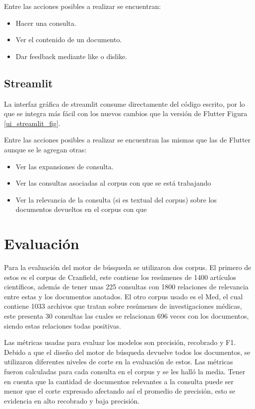 \documentclass[runningheads]{llncs}
\begin{document}
Entre las acciones posibles a realizar se encuentran:

\begin{itemize}

\item Hacer una consulta.
\item Ver el contenido de un documento.
\item Dar feedback mediante like o dislike.

\end{itemize}

\subsection{Streamlit}

La interfaz gráfica de streamlit consume directamente del código escrito, por lo que se 
integra más fácil con los nuevos cambios que la versión de Flutter Figura \ref{ui_streamlit_fig}.

Entre las acciones posibles a realizar se encuentran las mismas que las de Flutter aunque se le
agregan otras:

\begin{itemize}

\item Ver las expansiones de consulta.
\item Ver las consultas asociadas al corpus con que se está trabajando
\item Ver la relevancia de la consulta (si es textual del corpus) sobre los 
documentos devueltos en el corpus con que

\end{itemize}

\section{Evaluación}

Para la evaluación del motor de búsqueda se utilizaron dos corpus. El primero de estos
es el corpus de Cranfield, este contiene los resúmenes de 1400 artículos científicos, además
de tener unas 225 consultas con 1800 relaciones de relevancia entre estas y los documentos anotados.
El otro corpus usado es el Med, el cual contiene 1033 archivos que tratan sobre resúmenes de investigaciones
médicas, este presenta 30 consultas las cuales se relacionan 696 veces con los documentos, siendo estas
relaciones todas positivas.

Las métricas usadas para evaluar los modelos son precisión, recobrado y F1. Debido a que el diseño del
motor de búsqueda devuelve todos los documentos, se utilizaron diferentes niveles de corte en la evaluación
de estos. Las métricas fueron calculadas para cada consulta en el corpus y se les halló la media. Tener en cuenta
que la cantidad de documentos relevantes a la consulta puede ser menor que el corte expresado afectando así el
promedio de precisión, esto se evidencia en alto recobrado y baja precisión.
\end{document}
